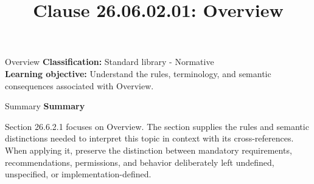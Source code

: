 \documentclass[10pt,letterpaper]{article}
\title{Clause 26.06.02.01: Overview}
\author{}
\date{}
\begin{document}
\maketitle
\begin{CornellOverviewBox}{Overview}
\textbf{Classification:} Standard library - Normative\\[2pt]
\textbf{Learning objective:} Understand the rules, terminology, and semantic consequences associated with Overview.
\end{CornellOverviewBox}\begin{CornellSummaryBox}{Summary}
{\sffamily\bfseries\color{Accent} Summary}\par\vspace{3pt}Section 26.6.2.1 focuses on Overview. The section supplies the rules and semantic distinctions needed to interpret this topic in context with its cross-references. When applying it, preserve the distinction between mandatory requirements, recommendations, permissions, and behavior deliberately left undefined, unspecified, or implementation-defined.
\end{CornellSummaryBox}
\end{document}
